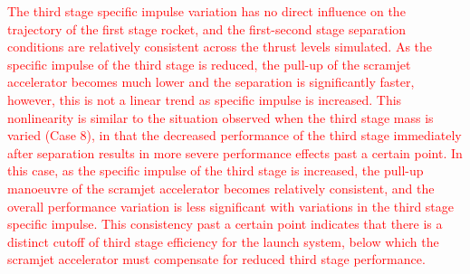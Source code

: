 \textcolor{red}{
The third stage specific impulse variation has no direct influence on the trajectory of the first stage rocket, and the first-second stage separation conditions are relatively consistent across the thrust levels simulated.
As the specific impulse of the third stage is reduced, the pull-up of the scramjet accelerator becomes much lower and the separation is significantly faster, however, this is not a linear trend as specific impulse is increased. This nonlinearity is similar to the situation observed when the third stage mass is varied (Case 8), in that the decreased performance of the third stage immediately after separation results in more severe performance effects past a certain point. In this case, as the specific impulse of the third stage is increased, the pull-up manoeuvre of the scramjet accelerator becomes relatively consistent, and the overall performance variation is less significant with variations in the third stage specific impulse. This consistency past a certain point indicates that there is a distinct cutoff of third stage efficiency for the launch system, below which the scramjet accelerator must compensate for reduced third stage performance. 
}



